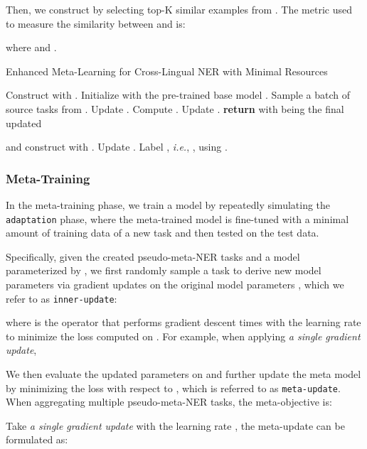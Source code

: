 \documentclass[letterpaper]{article} \usepackage{aaai20}  \usepackage{times}  \usepackage{helvet} \usepackage{courier}  \usepackage[hyphens]{url}  \usepackage{graphicx} \urlstyle{rm} \def\UrlFont{\rm}  \usepackage{graphicx}
\newcommand{\ie}{\textit{i.e.}}
\begin{document}
Then, we construct  by selecting top-K similar examples from .
The metric used to measure the similarity between  and  is:

where  and .

\begin{algorithm}[t]
\caption{Enhanced Meta-Learning for Cross-Lingual NER with Minimal Resources}
\label{alg:framework}

\begin{algorithmic}[1]
    \State Construct  with . \State Initialize with the pre-trained base model .
        \State Sample a batch of source tasks  from .
        \ForAll{}
            \State Update . \State Compute .
        \EndFor
        \State Update .
    \EndWhile
    \State \textbf{return}  with  being the final updated 
\EndProcedure
\item[]
    \ForAll{}
        \State  and construct  with .
        \State Update .
        \State Label , \ie, , using .
    \EndFor
\EndProcedure
\end{algorithmic}
\end{algorithm} \subsubsection{Meta-Training}
In the meta-training phase, we train a model  by repeatedly simulating the \texttt{adaptation} phase, where the meta-trained model is fine-tuned with a minimal amount of training data of a new task and then tested on the test data.

Specifically, given the created pseudo-meta-NER tasks  and a model  parameterized by , we first randomly sample a task  to derive new model parameters  via  gradient updates on the original model parameters , which we refer to as \texttt{inner-update}:

where  is the operator that performs gradient descent  times with the learning rate  to minimize the loss  computed on . For example, when applying \textit{a single gradient update},


We then evaluate the updated parameters  on  and further update the meta model  by minimizing the loss  with respect to , which is referred to as \texttt{meta-update}. When aggregating multiple pseudo-meta-NER tasks, the meta-objective is: 

Take \textit{a single gradient update} with the learning rate , the meta-update can be formulated as:
\end{document}
